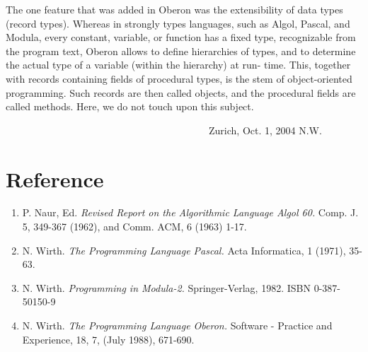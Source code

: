 The one feature that was added in Oberon was the extensibility of data types (record types).
Whereas in strongly types languages, such as Algol, Pascal, and Modula, every constant, variable,
or function has a fixed type, recognizable from the program text, Oberon allows to define
hierarchies of types, and to determine the actual type of a variable (within the hierarchy) at run-
time. This, together with records containing fields of procedural types, is the stem of object-oriented
programming. Such records are then called objects, and the procedural fields are called methods.
Here, we do not touch upon this subject.

~~~~~~~~~~~~~~~~~~~~~~~~~~~~~~~~~~~~~~~~~Zurich, Oct. 1, 2004 N.W.

\section*{Reference}
\begin{enumerate}
  \item P. Naur, Ed. \emph{Revised Report on the Algorithmic Language Algol 60.} Comp. J. 5, 349-367 (1962), and Comm. ACM, 6 (1963) 1-17.
  \item N. Wirth. \emph{The Programming Language Pascal.} Acta Informatica, 1 (1971), 35-63.
  \item N. Wirth. \emph{Programming in Modula-2.} Springer-Verlag, 1982. ISBN 0-387-50150-9
  \item N. Wirth. \emph{The Programming Language Oberon.} Software - Practice and Experience, 18, 7, (July 1988), 671-690.
\end{enumerate}
